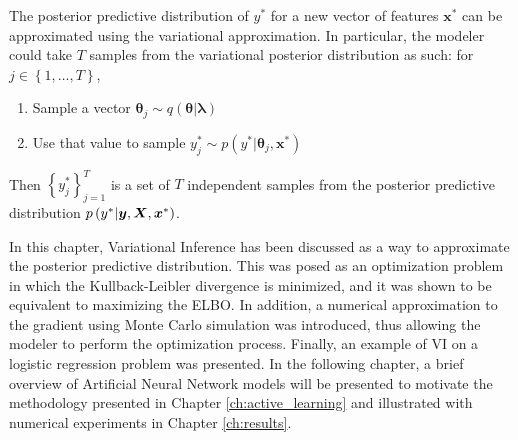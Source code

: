 The posterior predictive distribution of $y^*$ for a new vector of features $\boldsymbol{x}^*$ can be approximated using the variational approximation. In particular, the modeler could take $T$ samples from the variational posterior distribution as such: for $j \in \left\{ 1, \ldots, T \right\}$,
\begin{enumerate}
  \item Sample a vector $\boldsymbol{\theta}_j \sim q(\boldsymbol{\theta} | \boldsymbol{\lambda})$
  \item Use that value to sample $y_j^* \sim p(y^* | \boldsymbol{\theta}_j, \boldsymbol{x}^*)$
\end{enumerate}
Then $\left\{ y_j^* \right\}_{j = 1}^T$ is a set of $T$ independent samples from the posterior predictive distribution $p\left( y^* | \boldsymbol{y}, \boldsymbol{X}, \boldsymbol{x}^* \right)$.

In this chapter, Variational Inference has been discussed as a way to approximate the posterior predictive distribution. This was posed as an optimization problem in which the Kullback-Leibler divergence is minimized, and it was shown to be equivalent to maximizing the ELBO. In addition, a numerical approximation to the gradient using Monte Carlo simulation was introduced, thus allowing the modeler to perform the optimization process. Finally, an example of VI on a logistic regression problem was presented. In the following chapter, a brief overview of Artificial Neural Network models will be presented to motivate the methodology presented in Chapter \ref{ch:active_learning} and illustrated with numerical experiments in Chapter \ref{ch:results}.

